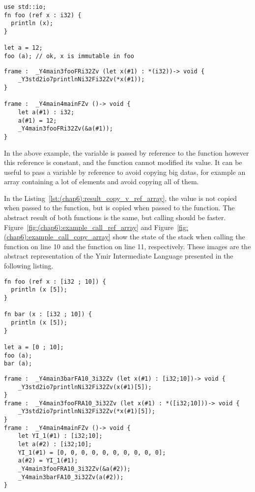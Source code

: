\begin{lstlisting}[style=coloredverbatim]
use std::io;
fn foo (ref x : i32) {
  println (x);
}

let a = 12;
foo (a); // ok, x is immutable in foo
\end{lstlisting}

\begin{lstlisting}[style=lyilVerb]
frame :  _Y4main3fooFRi32Zv (let x(#1) : *(i32))-> void {
    _Y3std2io7printlnNi32Fi32Zv(*x(#1));
}

frame :  _Y4main4mainFZv ()-> void {
    let a(#1) : i32;
    a(#1) = 12;
    _Y4main3fooFRi32Zv(&a(#1));
}
\end{lstlisting}

In the above example, the variable  is passed by reference to the
function  however this reference is constant, and the function
 cannot modified its value. It can be useful to pass a variable by
reference to avoid copying big datas, for example an array containing a lot of
elements and avoid copying all of them.



In the Listing~\ref{lst:(chap6):result_copy_v_ref_array}, the value is not copied when passed to the 
function, but is copied when passed to the  function. The abstract
result of both functions is the same, but calling  should be faster.
Figure~\ref{fig:(chap6):example_call_ref_array} and
Figure~\ref{fig:(chap6):example_call_copy_array} show the state of the stack when
calling the  function on line 10 and the  function on
line 11, respectively. These images are the abstract representation of the Ymir
Intermediate Language presented in the following listing.

\begin{lstlisting}[style=coloredverbatim, label=lst:(chap6):result_copy_v_ref_array, caption=Example of passing an array by reference vs. by value]
fn foo (ref x : [i32 ; 10]) {
  println (x [5]);
}

fn bar (x : [i32 ; 10]) {
  println (x [5]);
}

let a = [0 ; 10];
foo (a);
bar (a);
\end{lstlisting}

\begin{lstlisting}[style=lyilVerb, caption=YIL result of Listing~\ref{lst:result_copy_v_ref_array}]
frame :  _Y4main3barFA10_3i32Zv (let x(#1) : [i32;10])-> void {
    _Y3std2io7printlnNi32Fi32Zv(x(#1)[5]);
}
frame :  _Y4main3fooFRA10_3i32Zv (let x(#1) : *([i32;10]))-> void {
    _Y3std2io7printlnNi32Fi32Zv(*x(#1)[5]);
}
frame :  _Y4main4mainFZv ()-> void {
    let YI_1(#1) : [i32;10];
    let a(#2) : [i32;10];
    YI_1(#1) = [0, 0, 0, 0, 0, 0, 0, 0, 0, 0];
    a(#2) = YI_1(#1);
    _Y4main3fooFRA10_3i32Zv(&a(#2));
    _Y4main3barFA10_3i32Zv(a(#2));
}
\end{lstlisting}

